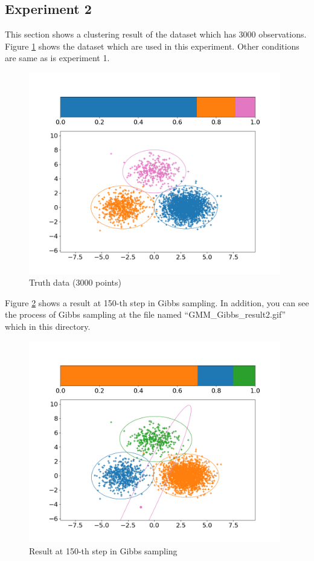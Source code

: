 \documentclass[a4paper]{article}
\begin{document}
	\subsection{Experiment 2}
	This section shows a clustering result of the dataset which has 3000 observations.
	Figure \ref{fig:ex2_truth} shows the dataset which are used in this experiment.
	Other conditions are same as is experiment 1.
	\begin{figure}[h]
		\begin{center}
			\includegraphics[width=11cm]{fig/ex2/truth.png}
			\caption{Truth data (3000 points)}
			\label{fig:ex2_truth}
		\end{center}
	\end{figure}

	Figure \ref{fig:ex2_result} shows a result at 150-th step in Gibbs sampling.
	In addition, you can see the process of Gibbs sampling at the file named ``GMM\_Gibbs\_result2.gif'' which in this directory.
	\begin{figure}[h]
		\begin{center}
			\includegraphics[width=11cm]{fig/ex2/final.png}
			\caption{Result at 150-th step in Gibbs sampling}
			\label{fig:ex2_result}
		\end{center}
	\end{figure}
\end{document}
